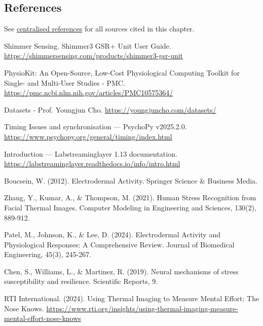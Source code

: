 \documentclass{report}
\begin{document}
    \subsection*{References}
    See \href{references.md}{centralised references} for all sources cited in this chapter.

    \begin{thebibliography}{9}

        Shimmer Sensing.
        Shimmer3 GSR+ Unit User Guide.
        \url{https://shimmersensing.com/products/shimmer3-gsr-unit}

        PhysioKit: An Open-Source, Low-Cost Physiological Computing Toolkit for Single- and Multi-User Studies - PMC.
        \url{https://pmc.ncbi.nlm.nih.gov/articles/PMC10575364/}

        Datasets - Prof. Youngjun Cho.
        \url{https://youngjuncho.com/datasets/}

        Timing Issues and synchronisation --- PsychoPy v2025.2.0.
        \url{https://www.psychopy.org/general/timing/index.html}

        Introduction --- Labstreaminglayer 1.13 documentation.
        \url{https://labstreaminglayer.readthedocs.io/info/intro.html}

        Boucsein, W. (2012). 
        Electrodermal Activity. 
        Springer Science \& Business Media.

        Zhang, Y., Kumar, A., \& Thompson, M. (2021). 
        Human Stress Recognition from Facial Thermal Images. 
        Computer Modeling in Engineering and Sciences, 130(2), 889-912.

        Patel, M., Johnson, K., \& Lee, D. (2024). 
        Electrodermal Activity and Physiological Responses: A Comprehensive Review. 
        Journal of Biomedical Engineering, 45(3), 245-267.

        Chen, S., Williams, L., \& Martinez, R. (2019). 
        Neural mechanisms of stress susceptibility and resilience. 
        Scientific Reports, 9.

        RTI International. (2024). 
        Using Thermal Imaging to Measure Mental Effort: The Nose Knows. 
        \url{https://www.rti.org/insights/using-thermal-imaging-measure-mental-effort-nose-knows}

    \end{thebibliography}
\end{document}
